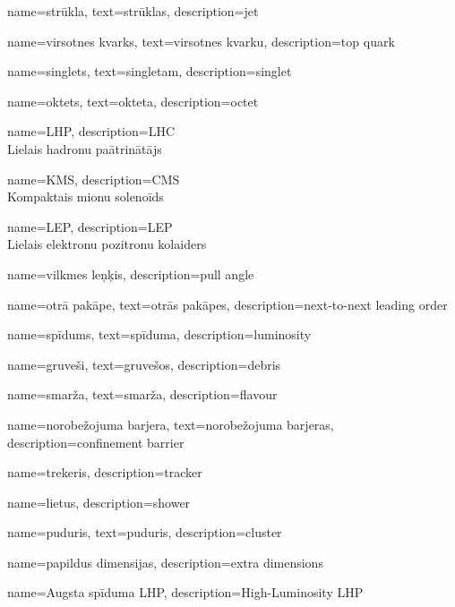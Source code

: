 {
  name=strūkla,
  text=strūklas,
  description={jet}
}

{
  name=virsotnes kvarks,
  text=virsotnes kvarku,
  description={top quark}
}

{
  name=singlets,
  text=singletam,
  description={singlet}
}

{
  name=oktets,
  text=okteta,
  description={octet}
}

{
  name=LHP,
  description={LHC\\Lielais hadronu paātrinātājs}
}

{
  name=KMS,
  description={CMS\\Kompaktais mionu solenoīds}
}

{
  name=LEP,
  description={LEP\\Lielais elektronu pozitronu kolaiders}
}

{
  name=vilkmes leņķis,
  description={pull angle}
}

{
  name=otrā pakāpe,
  text=otrās pakāpes,
  description={next-to-next leading order}
}


{
  name=spīdums,
  text=spīduma,
  description={luminosity}
}

{
        name=gruveši,
        text=gruvešos,
        description={debris}
}

{
        name=smarža,
        text=smarža,
        description={flavour}
}

{
        name=norobežojuma barjera,
        text=norobežojuma barjeras,
        description={confinement barrier}
}

{
        name=trekeris,
        description={tracker}
}

{
        name=lietus,
        description={shower}
}

{
        name=puduris,
        text=puduris,
        description={cluster}
}

{
        name=papildus dimensijas,
        description={extra dimensions}
}

{
        name=Augsta spīduma LHP,
        description={High-Luminosity LHP}
}

